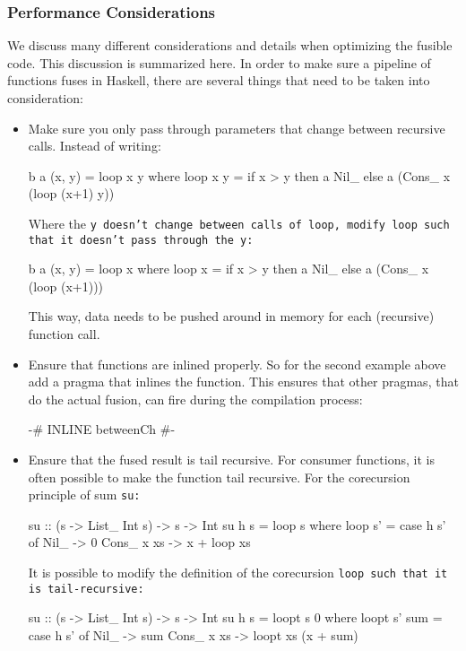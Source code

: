 \subsubsection{Performance Considerations}\label{sec:hs_perf}
We discuss many different considerations and details when optimizing the fusible code.
This discussion is summarized here.
In order to make sure a pipeline of functions fuses in Haskell, there are several things that need to be taken into consideration:
\begin{itemize}[noitemsep]
    \item Make sure you only pass through parameters that change between recursive calls. Instead of writing:
    \begin{spec}
b a (x, y) = loop x y
  where loop x y = if x > y
                   then a Nil_
                   else a (Cons_ x (loop (x+1) y))
    \end{spec}
    Where the \tt{y} doesn't change between calls of \tt{loop}, modify \tt{loop} such that it doesn't pass through the \tt{y}:
    \begin{spec}
b a (x, y) = loop x
  where loop x = if x > y
                 then a Nil_
                 else a (Cons_ x (loop (x+1)))
    \end{spec}
    This way, data needs to be pushed around in memory for each (recursive) function call.
    \item Ensure that functions are inlined properly. So for the second example above add a pragma that inlines the function.
    This ensures that other pragmas, that  do the actual fusion, can fire during the compilation process:
    \begin{spec}
        {-# INLINE betweenCh #-}
    \end{spec}
    \item Ensure that the fused result is tail recursive.
    For consumer functions, it is often possible to make the function tail recursive.
    For the corecursion principle of sum \tt{su}:
    \begin{spec}
su :: (s -> List_ Int s) -> s -> Int
su h s = loop s
  where loop s' = case h s' of
          Nil_ -> 0
          Cons_ x xs -> x + loop xs
    \end{spec}
    It is possible to modify the definition of the corecursion \tt{loop} such that it is tail-recursive:
    \begin{spec}
su :: (s -> List_ Int s) -> s -> Int
su h s = loopt s 0
  where loopt s' sum = case h s' of
          Nil_ -> sum
          Cons_ x xs -> loopt xs (x + sum)

\end{spec}
\end{itemize}
